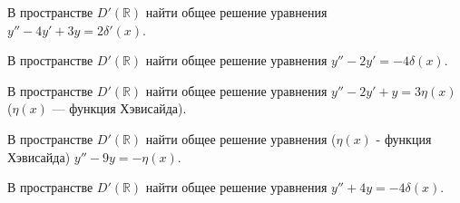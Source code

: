 \begin{cond}
	В пространстве \(D'(\mathbb{R})\) найти общее решение уравнения
	$y'' - 4y' + 3y = 2\delta'(x)$.
\end{cond}

\begin{cond}
	В пространстве \(D'(\mathbb{R})\) найти общее решение уравнения
	$y'' - 2y' = -4\delta(x)$.
\end{cond}

\begin{cond}
	В пространстве \(D'(\mathbb{R})\) найти общее решение уравнения
	$y'' - 2y' + y = 3\eta(x)$ \;(\(\eta(x)\) — функция Хэвисайда).
\end{cond}

\begin{cond}
	В пространстве \(D'(\mathbb{R})\) найти общее решение уравнения ($\eta(x)$ - функция Хэвисайда)
	$y'' - 9y = -\eta(x)$.
\end{cond}

\begin{cond}
	В пространстве \(D'(\mathbb{R})\) найти общее решение уравнения
	$y'' + 4y = -4\delta(x)$.
\end{cond}